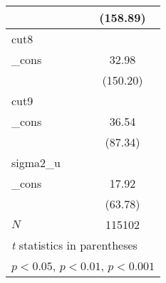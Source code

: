 {\begin{tabular}{l*{1}{c}}
            &    (158.89)         \\
\hline
cut8        &                     \\
\_cons      &       32.98\sym{***}\\
            &    (150.20)         \\
\hline
cut9        &                     \\
\_cons      &       36.54\sym{***}\\
            &     (87.34)         \\
\hline
sigma2\_u    &                     \\
\_cons      &       17.92\sym{***}\\
            &     (63.78)         \\
\hline
\(N\)       &      115102         \\
\hline\hline
\multicolumn{2}{l}{\footnotesize \textit{t} statistics in parentheses}\\
\multicolumn{2}{l}{\footnotesize \sym{*} \(p<0.05\), \sym{**} \(p<0.01\), \sym{***} \(p<0.001\)}\\
\end{tabular}
}
